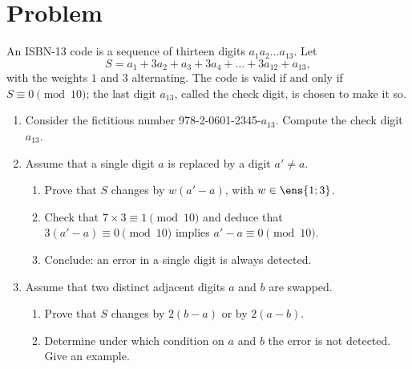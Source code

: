 \mxnewpage
\section{Problem}
\begin{problem}
An ISBN-13 code is a sequence of thirteen digits $a_1a_2\dots a_{13}$. Let
\[S=a_1+3a_2+a_3+3a_4+\dots+3a_{12}+a_{13},\]
with the weights $1$ and $3$ alternating. The code is valid if and only if $S\equiv0\pmod{10}$; the last digit $a_{13}$, called the check digit, is chosen to make it so.
\begin{enumerate}
\item Consider the fictitious number 978-2-0601-2345-$a_{13}$. Compute the check digit $a_{13}$.
\item Assume that a single digit $a$ is replaced by a digit $a'\neq a$.
\begin{enumerate}
\item Prove that $S$ changes by $w(a'-a)$, with $w\in\ens{1;3}$.
\item Check that $7\times3\equiv1\pmod{10}$ and deduce that $3(a'-a)\equiv0\pmod{10}$ implies $a'-a\equiv0\pmod{10}$.
\item Conclude: an error in a single digit is always detected.
\end{enumerate}
\item Assume that two distinct adjacent digits $a$ and $b$ are swapped.
\begin{enumerate}
\item Prove that $S$ changes by $2(b-a)$ or by $2(a-b)$.
\item Determine under which condition on $a$ and $b$ the error is not detected. Give an example.
\end{enumerate}
\end{enumerate}
\end{problem}
